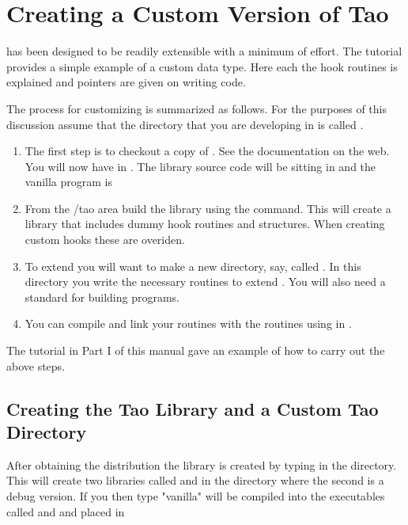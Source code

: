 \chapter{Creating a Custom Version of Tao}
\label{c:prog_customizing} 

\tao has been designed to be readily extensible with a minimum of
effort. The tutorial provides a simple example of a custom data type. Here each
the hook routines is explained and pointers are given on writing code. 

The process for customizing is summarized as follows. For the purposes of this
discussion assume that the directory that you are developing \tao in
is called . 
\begin{enumerate}
\item 
The first step is to checkout a
copy of \tao. See the \tao documentation on the web. You will now have \tao in
. The library source code will be sitting in 
and the vanilla \tao program is 
\item 
From the /tao area build the \tao library using the
 command. This will create a \tao library that includes dummy hook
routines and structures. When creating custom hooks these are overiden.
\item
To extend \tao you will want to make a new
directory, say, called . In this directory you write
the necessary routines to extend \tao. You will also need a standard 
 for building programs.
\item
You can compile and link your routines with the \tao routines using
 in .
\end{enumerate}

The tutorial in Part I of this manual gave an example of how to carry out the
above steps.

\section{Creating the Tao Library and a Custom Tao Directory}

After obtaining the \tao distribution the \tao library is created by typing
 in the  directory. This will create two libraries
called  and  in the directory  where
the second is a debug version. If you then type  "vanilla"
\tao will be compiled into the executables called  and  and
placed in 

